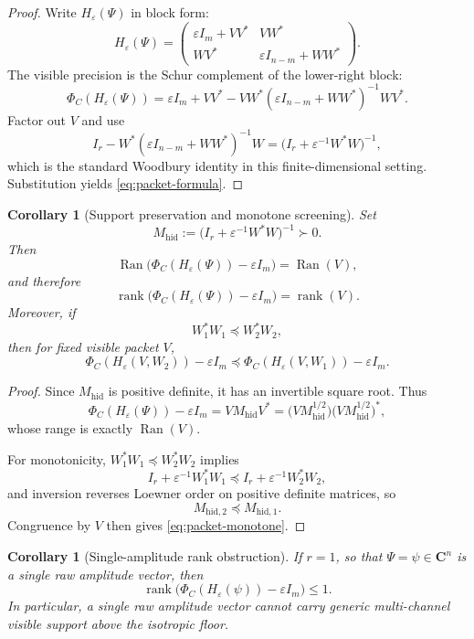 \documentclass[11pt,a4paper]{article}
\numberwithin{equation}{section}
\DeclareMathOperator{\Ran}{Ran}
\DeclareMathOperator{\rank}{rank}
\newcommand{\C}{\mathbf C}
\theoremstyle{thmcompact}
\newtheorem{corollary}[theorem]{Corollary}
\theoremstyle{remark}
\begin{document}
\begin{proof}
Write $H_\varepsilon(\Psi)$ in block form:
\[
H_\varepsilon(\Psi)=
\begin{pmatrix}
\varepsilon I_m + VV^* & VW^*\\
WV^* & \varepsilon I_{n-m}+WW^*
\end{pmatrix}.
\]
The visible precision is the Schur complement of the lower-right block:
\[
\Phi_C(H_\varepsilon(\Psi))
=
\varepsilon I_m + VV^* - VW^*(\varepsilon I_{n-m}+WW^*)^{-1}WV^*.
\]
Factor out $V$ and use
\[
I_r - W^*(\varepsilon I_{n-m}+WW^*)^{-1}W
=
\bigl(I_r+\varepsilon^{-1}W^*W\bigr)^{-1},
\]
which is the standard Woodbury identity in this finite-dimensional setting. Substitution yields \eqref{eq:packet-formula}.
\end{proof}

\begin{corollary}[Support preservation and monotone screening]
\label{cor:packet-support}
Set
\[
M_{\mathrm{hid}}:=\bigl(I_r+\varepsilon^{-1}W^*W\bigr)^{-1}\succ 0.
\]
Then
\begin{equation}
\Ran\bigl(\Phi_C(H_\varepsilon(\Psi))-\varepsilon I_m\bigr)=\Ran(V),
\label{eq:packet-support}
\end{equation}
and therefore
\[
\rank\bigl(\Phi_C(H_\varepsilon(\Psi))-\varepsilon I_m\bigr)=\rank(V).
\]
Moreover, if
\[
W_1^*W_1\preceq W_2^*W_2,
\]
then for fixed visible packet $V$,
\begin{equation}
\Phi_C(H_\varepsilon(V,W_2))-\varepsilon I_m
\preceq
\Phi_C(H_\varepsilon(V,W_1))-\varepsilon I_m.
\label{eq:packet-monotone}
\end{equation}
\end{corollary}

\begin{proof}
Since $M_{\mathrm{hid}}$ is positive definite, it has an invertible square root. Thus
\[
\Phi_C(H_\varepsilon(\Psi))-\varepsilon I_m
=
V M_{\mathrm{hid}} V^*
=
\bigl(VM_{\mathrm{hid}}^{1/2}\bigr)\bigl(VM_{\mathrm{hid}}^{1/2}\bigr)^*,
\]
whose range is exactly $\Ran(V)$.

For monotonicity, $W_1^*W_1\preceq W_2^*W_2$ implies
\[
I_r+\varepsilon^{-1}W_1^*W_1
\preceq
I_r+\varepsilon^{-1}W_2^*W_2,
\]
and inversion reverses Loewner order on positive definite matrices, so
\[
M_{\mathrm{hid},2}\preceq M_{\mathrm{hid},1}.
\]
Congruence by $V$ then gives \eqref{eq:packet-monotone}.
\end{proof}

\begin{corollary}[Single-amplitude rank obstruction]
\label{cor:single-amplitude}
If $r=1$, so that $\Psi=\psi\in \C^n$ is a single raw amplitude vector, then
\[
\rank\bigl(\Phi_C(H_\varepsilon(\psi))-\varepsilon I_m\bigr)\le 1.
\]
In particular, a single raw amplitude vector cannot carry generic multi-channel visible support above the isotropic floor.
\end{corollary}
\end{document}
